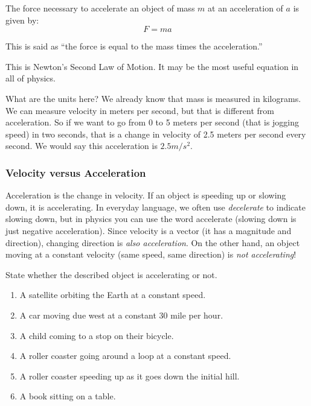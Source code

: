 \begin{mdframed}[style=important, frametitle={Newton's Second Law of Motion}]

The force necessary to accelerate an object of mass $m$ at an acceleration of
$a$ is given by:
$$F = m a$$

This is said as ``the force is equal to the mass times the acceleration.''

\end{mdframed}

This is Newton's Second Law of Motion. It may be the most useful equation in all of physics.

What are the units here? We already know that mass is measured in
kilograms. We can measure velocity in meters per second, but that is
different from acceleration. So if we want to go from 0 to 5 meters per second (that is
jogging speed) in two seconds, that is a change in velocity of 2.5
meters per second every second. We would say this acceleration is $2.5
m/s^2$.

\subsubsection{Velocity versus Acceleration}
Acceleration is the change in velocity. If an object is speeding up or slowing 
down, it is accelerating. In everyday language, we often use \textit{decelerate} 
to indicate slowing down, but in physics you can use the word accelerate (slowing 
down is just negative acceleration). Since velocity is a vector (it has a 
magnitude and direction), changing direction is \textit{also acceleration}. On 
the other hand, an object moving at a constant velocity (same speed, same 
direction) is \textit{not accelerating}!

\begin{Exercise}[title = {Is it accelerating?}, label = accel]
State whether the described object is accelerating or not. 
\begin{enumerate}
\item A satellite orbiting the Earth at a constant speed.
\item A car moving due west at a constant 30 mile per hour.
\item A child coming to a stop on their bicycle.
\item A roller coaster going around a loop at a constant speed.
\item A roller coaster speeding up as it goes down the initial hill.
\item A book sitting on a table. 
\end{enumerate}
\end{Exercise}

